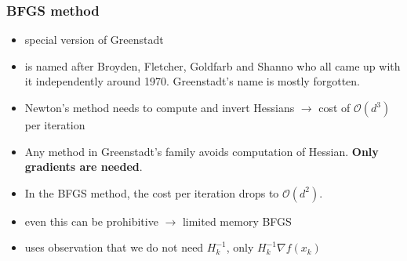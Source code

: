 \documentclass{beamer}
\begin{document}
\begin{frame}
  \frametitle{BFGS method}
  \begin{itemize}
    \item special version of Greenstadt
    \item is named after Broyden, Fletcher, Goldfarb and Shanno
          who all came up with it independently around 1970. Greenstadt’s name is
          mostly forgotten.
    \item Newton’s method needs to compute and invert
          Hessians $\rightarrow$ cost of $\mathcal{O}(d^3)$ per iteration
    \item Any method in Greenstadt’s family avoids computation of Hessian.
          \textbf{Only gradients are needed}.
    \item In the BFGS method, the cost per iteration drops to $\mathcal{O}(d^2)$.
    \item even this can be prohibitive $\rightarrow$ limited memory BFGS
    \item uses observation that we do not need $H_{k}^{-1}$, only $H_{k}^{-1} \nabla f(x_k)$
  \end{itemize}

\end{frame}
\end{document}
